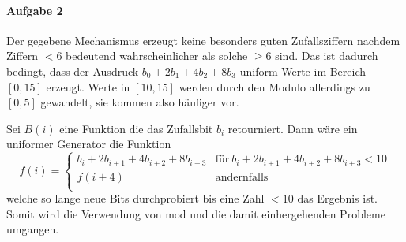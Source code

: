 \documentclass{article}
\newcommand{\cmod}{\text{mod}}
\begin{document}
\paragraph{Aufgabe 2}

Der gegebene Mechanismus erzeugt keine besonders guten Zufallsziffern nachdem Ziffern $< 6$ bedeutend wahrscheinlicher als solche $\geq 6$ sind. Das ist dadurch bedingt, dass der Ausdruck $b_0 + 2b_1 + 4b_2 + 8b_3$ uniform Werte im Bereich $[0, 15]$ erzeugt. Werte in $[10, 15]$ werden durch den Modulo allerdings zu $[0, 5]$ gewandelt, sie kommen also h\"aufiger vor.

\begin{table}[h]
    \centering
    \caption{Relative H\"aufigkeit der m\"oglichen Ziffern, $n = 1000000$.}
\end{table}

Sei $B(i)$ eine Funktion die das Zufallsbit $b_i$ retourniert. Dann w\"are ein uniformer Generator die Funktion
\begin{equation*}
    f(i) = \begin{cases}
        b_{i} + 2b_{i + 1} + 4b_{i + 2} + 8b_{i + 3} & \text{f\"ur}\ b_{i} + 2b_{i + 1} + 4b_{i + 2} + 8b_{i + 3} < 10 \\
        f(i + 4) & \text{andernfalls} \\
    \end{cases}
\end{equation*}
welche so lange neue Bits durchprobiert bis eine Zahl $< 10$ das Ergebnis ist. Somit wird die Verwendung von $\cmod$ und die damit einhergehenden Probleme umgangen. 
\end{document}
